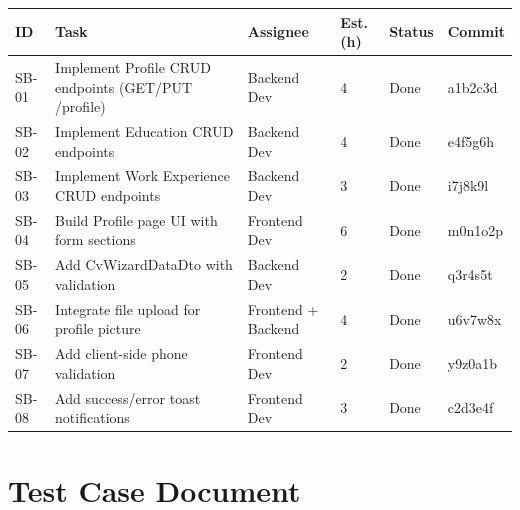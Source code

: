 \documentclass[12pt,a4paper]{report}
\begin{document}
\begin{longtable}{|p{0.8cm}|p{4cm}|p{3cm}|p{2cm}|p{1.5cm}|p{1.5cm}|}
\hline
\textbf{ID} & \textbf{Task} & \textbf{Assignee} & \textbf{Est. (h)} & \textbf{Status} & \textbf{Commit} \\
\hline
SB-01 & Implement Profile CRUD endpoints (GET/PUT /profile) & Backend Dev & 4 & Done & a1b2c3d \\
\hline
SB-02 & Implement Education CRUD endpoints & Backend Dev & 4 & Done & e4f5g6h \\
\hline
SB-03 & Implement Work Experience CRUD endpoints & Backend Dev & 3 & Done & i7j8k9l \\
\hline
SB-04 & Build Profile page UI with form sections & Frontend Dev & 6 & Done & m0n1o2p \\
\hline
SB-05 & Add CvWizardDataDto with validation & Backend Dev & 2 & Done & q3r4s5t \\
\hline
SB-06 & Integrate file upload for profile picture & Frontend + Backend & 4 & Done & u6v7w8x \\
\hline
SB-07 & Add client-side phone validation & Frontend Dev & 2 & Done & y9z0a1b \\
\hline
SB-08 & Add success/error toast notifications & Frontend Dev & 3 & Done & c2d3e4f \\
\hline
\end{longtable}

\section{Test Case Document}
\end{document}
